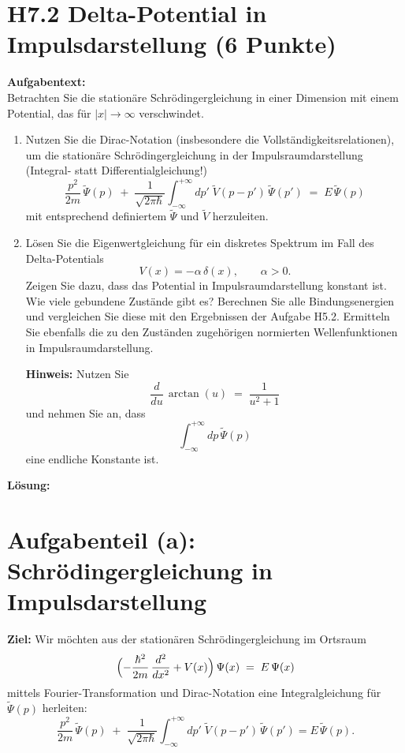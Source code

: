 \documentclass[12pt,a4paper]{scrartcl}
\begin{document}
\section*{H7.2 Delta-Potential in Impulsdarstellung (6 Punkte)}

\textbf{Aufgabentext:}\\
Betrachten Sie die stationäre Schrödingergleichung in einer Dimension mit einem Potential, das für $|x| \to \infty$ verschwindet.
\begin{enumerate}[label=(\alph*)]
  \item Nutzen Sie die Dirac-Notation (insbesondere die Vollständigkeitsrelationen), um die stationäre Schrödingergleichung in der Impulsraumdarstellung (Integral- statt Differentialgleichung!)
  \[
    \frac{p^2}{2m}\,\widetilde\Psi(p) \;+\; \frac{1}{\sqrt{2\pi\hbar}} \int_{-\infty}^{+\infty} dp'\; \widetilde V(p - p')\,\widetilde\Psi(p') \;=\; E\,\widetilde\Psi(p)
  \]
  mit entsprechend definiertem $\widetilde\Psi$ und $\widetilde V$ herzuleiten.
  \item Lösen Sie die Eigenwertgleichung für ein diskretes Spektrum im Fall des Delta-Potentials 
  \[
    V(x) = - \alpha\,\delta(x), \qquad \alpha > 0.
  \]
  Zeigen Sie dazu, dass das Potential in Impulsraumdarstellung konstant ist. Wie viele gebundene Zustände gibt es? Berechnen Sie alle Bindungsenergien und vergleichen Sie diese mit den Ergebnissen der Aufgabe H5.2. Ermitteln Sie ebenfalls die zu den Zuständen zugehörigen normierten Wellenfunktionen in Impulsraumdarstellung.

  \textbf{Hinweis:} Nutzen Sie 
  \[
    \frac{d}{du}\,\arctan(u) \;=\; \frac{1}{u^2+1}
  \]
  und nehmen Sie an, dass 
  \[
    \int_{-\infty}^{+\infty} dp\,\widetilde\Psi(p)
  \]
  eine endliche Konstante ist.
\end{enumerate}

\hrulefill

\bigskip
\textbf{Lösung:}

\section{Aufgabenteil (a): Schrödingergleichung in Impulsdarstellung}

\textbf{Ziel:} Wir möchten aus der stationären Schrödingergleichung im Ortsraum
\[
  \Bigl(-\frac{\hbar^2}{2m}\,\frac{d^2}{dx^2} + V(x)\Bigr)\,\Psi(x) \;=\; E\,\Psi(x)
\]
mittels Fourier-Transformation und Dirac-Notation eine Integralgleichung für $\widetilde\Psi(p)$ herleiten:
\[
  \frac{p^2}{2m}\,\widetilde\Psi(p) \;+\; \frac{1}{\sqrt{2\pi\hbar}} \int_{-\infty}^{+\infty} dp'\; \widetilde V(p - p')\,\widetilde\Psi(p') = E\,\widetilde\Psi(p).
\]
\end{document}

